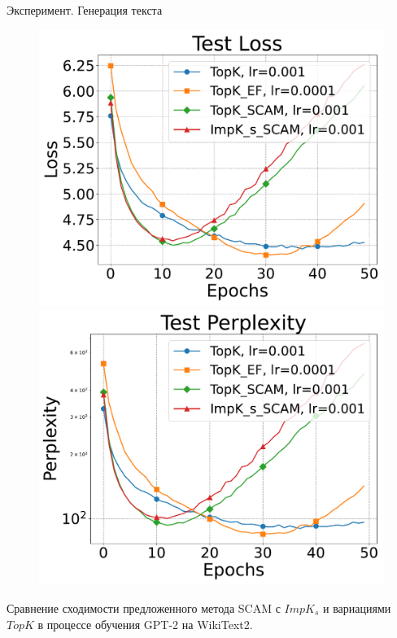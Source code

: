 \documentclass{beamer}
\begin{document}
\begin{frame}{Эксперимент. Генерация текста}
\begin{figure}[ht]
\begin{minipage}{0.4\textwidth}
        \end{minipage}
        \begin{minipage}{0.4\textwidth}
            \includegraphics[width=\textwidth]{../paper/figures/gpt2/experiment2/Test Loss.pdf}
        \end{minipage}
        \begin{minipage}{0.4\textwidth}
            \includegraphics[width=\textwidth]{../paper/figures/gpt2/experiment2/Test Perplexity.pdf}
        \end{minipage}
    \end{figure}
    Сравнение сходимости предложенного метода SCAM с $ImpK_s$ и вариациями $TopK$ в процессе обучения GPT-2 на WikiText2.

\end{frame}
\end{document}
